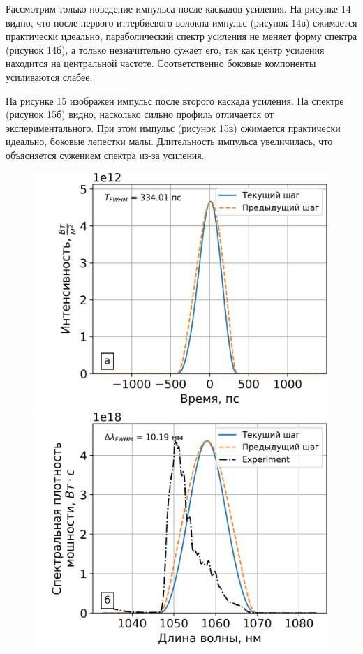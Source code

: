 \documentclass[12pt]{article}
\begin{document}
Рассмотрим только поведение импульса после каскадов усиления. На рисунке 14 видно, что после первого иттербиевого
волокна импульс (рисунок 14в) сжимается практически идеально, параболический спектр усиления не меняет форму спектра
(рисунок 14б), а только незначительно сужает его, так как центр усиления находится на центральной частоте.
Соответственно боковые компоненты усиливаются слабее.

На рисунке 15 изображен импульс после второго каскада усиления. На спектре (рисунок 15б) видно, насколько сильно профиль
отличается от экспериментального. При этом импульс (рисунок 15в) сжимается практически идеально, боковые лепестки малы.
Длительность импульса увеличилась, что объясняется сужением спектра из-за усиления.

\begin{figure}[h!]
  \centering
  \begin{minipage}[b]{0.5\textwidth}
    \includegraphics[width=\linewidth]{Images/Gauss Pulse Parabolic Profile/Импульс и спектр/!14. Yb3+ 6_125, 0.8m_pusle}
  \end{minipage}%
  \begin{minipage}[b]{0.5\textwidth}
    \includegraphics[width=\linewidth]{Images/Gauss Pulse Parabolic Profile/Импульс и спектр/!14. Yb3+ 6_125, 0.8m_spectrum}

\end{minipage}
\end{figure}
\end{document}
